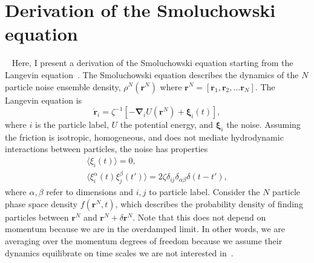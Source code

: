 \chapter{Derivation of the Smoluchowski equation}~\label{appx:smoluchowski}
Here, I present a derivation of the Smoluchowski equation starting from the
Langevin equation~\cite{zwanzig_nonequilibrium_01}. The Smoluchowski equation describes the dynamics of the $N$
particle noise ensemble density, $\rho^{N}(\bm{r}^N)$ where $\bm{r}^N = [
\bm{r}_1, \bm{r}_2, \dots \bm{r}_N]$. The Langevin equation is
%
\begin{equation}
  \label{eqn:full_langevin}
   \dot{\bm{r}}_i = \zeta ^{-1}
     \left[ -\bm{\nabla}_i U( \bm{r}^N )
       + \bm{\xi}_i(t) \right],
\end{equation}
%
where $i$ is the particle label, $U$ the potential energy, and $\bm{\xi}_i$ the
noise. Assuming the friction is isotropic, homogeneous, and does not mediate
hydrodynamic interactions between particles, the noise has properties
\begin{gather}
  \langle \xi_i( t ) \rangle = 0, \\
  \langle \xi^{\alpha}_i( t ) \xi^{\beta}_j( t') \rangle 
  = 2 \zeta \delta_{ij} \delta_{\alpha \beta} \delta(t-t'),
\end{gather}
%
where $\alpha, \beta$ refer to dimensions and $i,j$ to particle label.  Consider
the $N$ particle phase space density $f(\bm{r}^N,t)$, which describes the
probability density of finding particles between $\bm{r}^N$ and $\bm{r}^N+\delta
\bm{r}^N$.  Note that this does not depend on momentum  because we are in the
overdamped limit.  In other words, we are averaging over the momentum degrees of
freedom because we assume their dynamics equilibrate on time scales we are not
interested in~\cite{archer_dynamical_04}.

